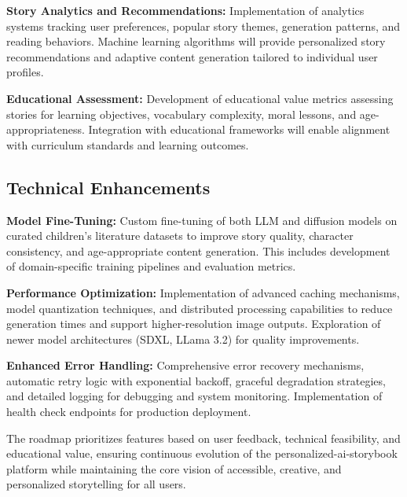\textbf{Story Analytics and Recommendations:} Implementation of analytics systems tracking user preferences, popular story themes, generation patterns, and reading behaviors. Machine learning algorithms will provide personalized story recommendations and adaptive content generation tailored to individual user profiles.

\textbf{Educational Assessment:} Development of educational value metrics assessing stories for learning objectives, vocabulary complexity, moral lessons, and age-appropriateness. Integration with educational frameworks will enable alignment with curriculum standards and learning outcomes.

\subsection{Technical Enhancements}

\textbf{Model Fine-Tuning:} Custom fine-tuning of both LLM and diffusion models on curated children's literature datasets to improve story quality, character consistency, and age-appropriate content generation. This includes development of domain-specific training pipelines and evaluation metrics.

\textbf{Performance Optimization:} Implementation of advanced caching mechanisms, model quantization techniques, and distributed processing capabilities to reduce generation times and support higher-resolution image outputs. Exploration of newer model architectures (SDXL, LLama 3.2) for quality improvements.

\textbf{Enhanced Error Handling:} Comprehensive error recovery mechanisms, automatic retry logic with exponential backoff, graceful degradation strategies, and detailed logging for debugging and system monitoring. Implementation of health check endpoints for production deployment.

The roadmap prioritizes features based on user feedback, technical feasibility, and educational value, ensuring continuous evolution of the personalized-ai-storybook platform while maintaining the core vision of accessible, creative, and personalized storytelling for all users.
